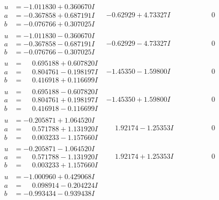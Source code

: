 \documentclass[1p]{elsarticle_modified}
\theoremstyle{definition}
\begin{document}
$$\begin{array}{c|c|c}
\begin{aligned}
u &= -1.011830 + 0.360670 I \\
a &= -0.367858 + 0.687191 I \\
b &= -0.076766 + 0.307025 I\end{aligned}
 & -0.62929 + 4.73327 I & \phantom{-0.000000 } 0 \\ \hline\begin{aligned}
u &= -1.011830 - 0.360670 I \\
a &= -0.367858 - 0.687191 I \\
b &= -0.076766 - 0.307025 I\end{aligned}
 & -0.62929 - 4.73327 I & \phantom{-0.000000 } 0 \\ \hline\begin{aligned}
u &= \phantom{-}0.695188 + 0.607820 I \\
a &= \phantom{-}0.804761 - 0.198197 I \\
b &= \phantom{-}0.416918 + 0.116699 I\end{aligned}
 & -1.45350 - 1.59800 I & \phantom{-0.000000 } 0 \\ \hline\begin{aligned}
u &= \phantom{-}0.695188 - 0.607820 I \\
a &= \phantom{-}0.804761 + 0.198197 I \\
b &= \phantom{-}0.416918 - 0.116699 I\end{aligned}
 & -1.45350 + 1.59800 I & \phantom{-0.000000 } 0 \\ \hline\begin{aligned}
u &= -0.205871 + 1.064520 I \\
a &= \phantom{-}0.571788 + 1.131920 I \\
b &= \phantom{-}0.003233 - 1.157660 I\end{aligned}
 & \phantom{-}1.92174 - 1.25353 I & \phantom{-0.000000 } 0 \\ \hline\begin{aligned}
u &= -0.205871 - 1.064520 I \\
a &= \phantom{-}0.571788 - 1.131920 I \\
b &= \phantom{-}0.003233 + 1.157660 I\end{aligned}
 & \phantom{-}1.92174 + 1.25353 I & \phantom{-0.000000 } 0 \\ \hline\begin{aligned}
u &= -1.000960 + 0.429068 I \\
a &= \phantom{-}0.098914 - 0.204224 I \\
b &= -0.993434 - 0.939438 I\end{aligned}

\end{array}$$
\end{document}
